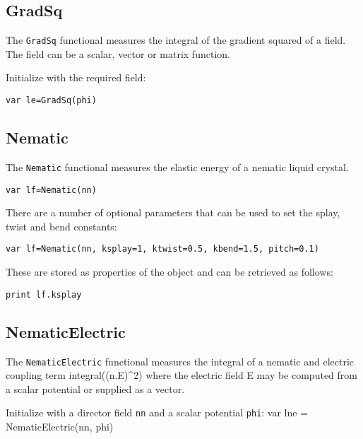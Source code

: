 \hypertarget{gradsq}{%
\subsection{GradSq}\label{gradsq}}

The \texttt{GradSq} functional measures the integral of the gradient
squared of a field. The field can be a scalar, vector or matrix
function.

Initialize with the required field:

\begin{lstlisting}
var le=GradSq(phi)
\end{lstlisting}

\hypertarget{nematic}{%
\subsection{Nematic}\label{nematic}}

The \texttt{Nematic} functional measures the elastic energy of a nematic
liquid crystal.

\begin{lstlisting}
var lf=Nematic(nn)
\end{lstlisting}

There are a number of optional parameters that can be used to set the
splay, twist and bend constants:

\begin{lstlisting}
var lf=Nematic(nn, ksplay=1, ktwist=0.5, kbend=1.5, pitch=0.1)
\end{lstlisting}

These are stored as properties of the object and can be retrieved as
follows:

\begin{lstlisting}
print lf.ksplay
\end{lstlisting}

\hypertarget{nematicelectric}{%
\subsection{NematicElectric}\label{nematicelectric}}

The \texttt{NematicElectric} functional measures the integral of a
nematic and electric coupling term integral((n.E)\^{}2) where the
electric field E may be computed from a scalar potential or supplied as
a vector.

Initialize with a director field \texttt{nn} and a scalar potential
\texttt{phi}: var lne = NematicElectric(nn, phi)

